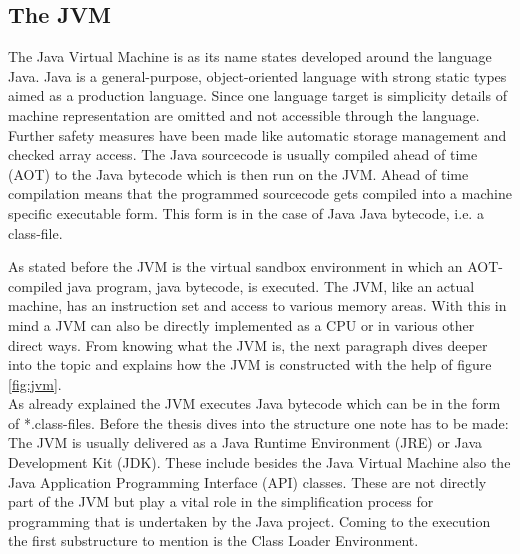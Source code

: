 \subsection{The JVM}
The Java Virtual Machine is as its name states developed around the language Java. Java is a general-purpose, object-oriented language with strong static types aimed as a production language. Since one language target is simplicity details of machine representation are omitted and not accessible through the language. Further safety measures have been made like automatic storage management and checked array access. The Java sourcecode is usually compiled ahead of time (AOT) to the Java bytecode which is then run on the JVM. Ahead of time compilation means that the programmed sourcecode gets compiled into a machine specific executable form. This form is in the case of Java Java bytecode, i.e. a class-file.\cite{Gosling}\par As stated before the JVM is the virtual sandbox environment in which an AOT-compiled java program, java bytecode, is executed. The JVM, like an actual machine, has an instruction set and access to various memory areas. With this in mind a JVM can also be directly implemented as a CPU or in various other direct ways. From knowing what the JVM is, the next paragraph dives deeper into the topic and explains how the JVM is constructed with the help of figure \ref{fig:jvm}.\\
As already explained the JVM executes Java bytecode which can be in the form of *.class-files. Before the thesis dives into the structure one note has to be made: The JVM is usually delivered as a Java Runtime Environment (JRE) or Java Development Kit (JDK). These include besides the Java Virtual Machine also the Java Application Programming Interface (API) classes. These are not directly part of the JVM but play a vital role in the simplification process for programming that is undertaken by the Java project. Coming to the execution the first substructure to mention is the Class Loader Environment.\\
